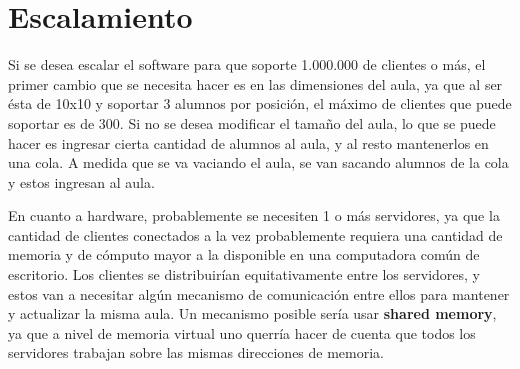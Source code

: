 \section{Escalamiento}
\label{sec:Esc}

Si se desea escalar el software para que soporte 1.000.000 de clientes o m\'as, el primer cambio que se necesita hacer es en las dimensiones del aula, 
ya que al ser \'esta de 10x10 y soportar 3 alumnos por posici\'on, el m\'aximo de clientes que puede soportar es de 300. Si no se desea modificar el tama\~no del aula, lo que se 
puede hacer es ingresar cierta cantidad de alumnos al aula, y al resto mantenerlos en una cola. A medida que se va vaciando el aula, se van sacando alumnos de la cola y estos ingresan 
al aula.

En cuanto a hardware, probablemente se necesiten 1 o m\'as servidores, ya que la cantidad de clientes conectados a la vez probablemente requiera una cantidad de memoria y de c\'omputo mayor a la disponible
en una computadora com\'un de escritorio. Los clientes se distribuir\'ian equitativamente entre los servidores, y estos van a necesitar alg\'un mecanismo de comunicaci\'on entre ellos para mantener y actualizar la misma aula. 
Un mecanismo posible ser\'ia usar \textbf{shared memory}, ya que a nivel de memoria virtual uno querr\'ia hacer de cuenta que todos los servidores trabajan sobre las mismas direcciones de memoria.